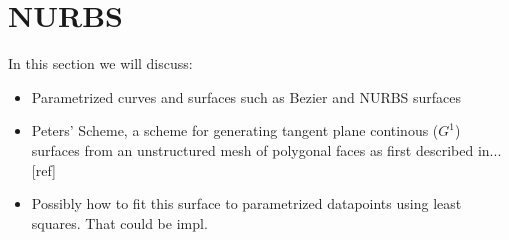 \section{\acf{NURBS}}
\label{sec:NURBS}

In this section we will discuss:
\begin{itemize}
\item Parametrized curves and surfaces such as Bezier and NURBS surfaces
\item Peters' Scheme, a scheme for generating tangent plane continous ($G^1$) surfaces from an unstructured mesh of polygonal faces as first described in...[ref]
\item Possibly how to fit this surface to parametrized datapoints using least squares. That could be impl.
\end{itemize}



